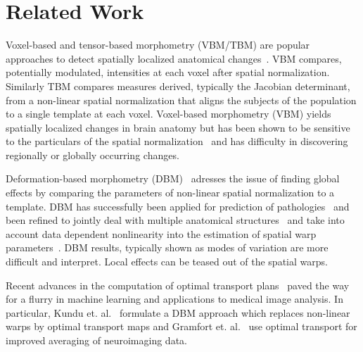 \documentclass{llncs}
\begin{document}
\section{Related Work}


Voxel-based and tensor-based morphometry (VBM/TBM) are popular approaches to
detect spatially localized anatomical changes~\cite{ashburner2000voxel}. VBM
compares, potentially modulated, intensities at each voxel after
spatial normalization. Similarly TBM compares measures derived, typically the
Jacobian determinant, from a non-linear spatial normalization that aligns the
subjects of the population to a single template at each voxel. 
Voxel-based
morphometry (VBM) yields spatially localized changes in brain anatomy but has
been shown to be sensitive to the particulars of the spatial
normalization~\cite{bookstein2001voxel,davatzikos2004voxel} and has
difficulty in discovering regionally or globally occurring changes. 

Deformation-based morphometry (DBM)~\cite{ashburner1998identifying} adresses
the issue of finding global effects by comparing the parameters of non-linear
spatial normalization to a template.  DBM has successfully been applied for
prediction of pathologies~\cite{gaser2001deformation,lao2004morphological} and
been refined to jointly deal with multiple anatomical
structures~\cite{durrleman2014morphometry} and take into account data dependent
nonlinearity into the estimation of spatial warp
parameters~\cite{gerber2010manifold}. DBM results, typically shown as modes of
variation are more difficult and interpret. Local effects can be teased out of
the spatial warps.

Recent advances in the computation of optimal transport
plans~\cite{cuturi2013sinkhorn,gerber2017multiscale} paved the way for a flurry
in machine learning and applications to medical image analysis. In particular,
Kundu et. al.~\cite{kundu2018discovery} formulate a DBM approach which replaces
non-linear warps by optimal transport maps and Gramfort et.
al.~\cite{gramfort2015fast} use optimal transport for improved averaging of
neuroimaging data. 
\end{document}
